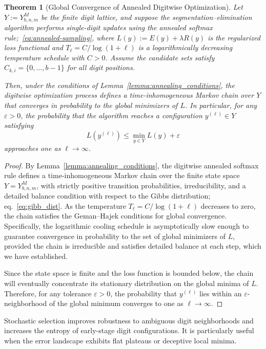 \documentclass[aps,twocolumn,superscriptaddress,nofootinbib]{revtex4}
\newtheorem{theorem}{Theorem}
\begin{document}
\begin{theorem}[Global Convergence of Annealed Digitwise Optimization]
\label{thm:annealing_global_convergence}
Let \( Y := Y_{b,n,m}^M \) be the finite digit lattice, and suppose the segmentation--elimination algorithm performs single-digit updates using the annealed softmax rule;~\eqref{eq:annealed-sampling}, where \( L(y) := E(y) + \lambda R(y) \) is the regularized loss functional and \( T_\ell = C / \log(1 + \ell) \) is a logarithmically decreasing temperature schedule with \( C > 0 \). Assume the candidate sets satisfy \( C_{k,i} = \{0, \dots, b-1\} \) for all digit positions.

Then, under the conditions of Lemma~\ref{lemma:annealing_conditions}, the digitwise optimization process defines a time-inhomogeneous Markov chain over \( Y \) that converges in probability to the global minimizers of \( L \). In particular, for any \( \varepsilon > 0 \), the probability that the algorithm reaches a configuration \( y^{(\ell)} \in Y \) satisfying
\[
L(y^{(\ell)}) \leq \min_{y \in Y} L(y) + \varepsilon
\]
approaches one as \( \ell \to \infty \).

\end{theorem}

\begin{proof}
By Lemma~\ref{lemma:annealing_conditions}, the digitwise annealed softmax rule defines a time-inhomogeneous Markov chain over the finite state space \( Y = Y_{b,n,m}^M \), with strictly positive transition probabilities, irreducibility, and a detailed balance condition with respect to the Gibbs distribution; eq.~\eqref{eq:gibb_dist}. As the temperature \( T_\ell = C / \log(1 + \ell) \) decreases to zero, the chain satisfies the Geman–Hajek conditions for global convergence. Specifically, the logarithmic cooling schedule is asymptotically slow enough to guarantee convergence in probability to the set of global minimizers of \( L \), provided the chain is irreducible and satisfies detailed balance at each step, which we have established.

Since the state space is finite and the loss function is bounded below, the chain will eventually concentrate its stationary distribution on the global minima of \( L \). Therefore, for any tolerance \( \varepsilon > 0 \), the probability that \( y^{(\ell)} \) lies within an \( \varepsilon \)-neighborhood of the global minimum converges to one as \( \ell \to \infty \).
\end{proof}


Stochastic selection improves robustness to ambiguous digit neighborhoods and increases the entropy of early-stage digit configurations. It is particularly useful when the error landscape exhibits flat plateaus or deceptive local minima.
\end{document}
